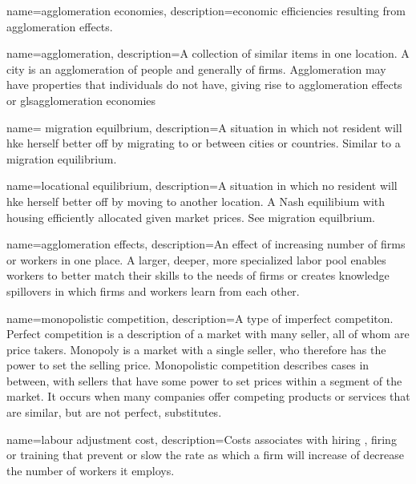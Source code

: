 


{
name=agglomeration economies,
description={economic efficiencies resulting from \gls{agglomeration effects}.}
}

{
name=agglomeration,
description={A collection of similar items in one location. A city is an agglomeration of people and generally of firms. Agglomeration may have properties that individuals do not have, giving rise to \gls{agglomeration effects} or gls{agglomeration economies} }
}

{
name= migration equilbrium,
description={A situation in which not resident will hke herself better off by migrating to or between cities or countries. Similar to a migration equilibrium.}
}


{
name=locational equilibrium,
description={A situation in which no resident will hke herself better off by moving to another location. A Nash equilibium with housing efficiently allocated  given market prices. See \gls{migration equilbrium}.}
}


{
name=agglomeration effects,
description={An effect of increasing number of firms  or workers in one place. A larger, deeper, more specialized labor pool enables workers to better match their skills to the needs of firms or creates knowledge spillovers in which firms and workers learn from each other.}
}

{
name=monopolistic competition,
description={A type of imperfect competiton. Perfect competition is a description of a market with many seller, all of whom are price takers. Monopoly is a market with a single seller, who therefore has the power to set the selling price. Monopolistic competition describes cases in between, with sellers that have some power to set prices within a segment of the market. It occurs when many companies offer competing products or services that are similar, but are not perfect, substitutes.}
}

{
name=labour adjustment cost,
description={Costs associates with hiring , firing or training that prevent or slow the rate as which a firm will increase of decrease the number of workers it employs.}
}

